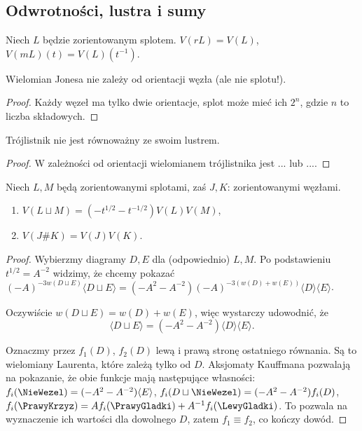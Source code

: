 \subsection{Odwrotności, lustra i sumy}

\begin{twierdzenie}
Niech $L$ będzie zorientowanym splotem.
$V(rL)=V(L)$, $V(mL)(t)=V(L)(t^{-1})$.
\end{twierdzenie}

\begin{wniosek}
Wielomian Jonesa nie zależy od orientacji węzła (ale nie splotu!).
\end{wniosek}

\begin{proof}
Każdy węzeł ma tylko dwie orientacje, splot może mieć ich $2^n$, gdzie $n$ to liczba składowych.
\end{proof}

\begin{wniosek}
Trójlistnik nie jest równoważny ze swoim lustrem.
\end{wniosek}

\begin{proof}
W zależności od orientacji wielomianem trójlistnika jest $...$ lub $...$.
\end{proof}

\begin{twierdzenie}
Niech $L, M$ będą zorientowanymi splotami, zaś $J, K$: zorientowanymi węzłami.
\begin{enumerate}
\item $V(L \sqcup M) = (-t^{1/2} - t^{-1/2}) V(L) V(M)$,
\item $V(J \# K) = V(J) V(K)$.
\end{enumerate}
\end{twierdzenie}

\begin{proof}
Wybierzmy diagramy $D, E$ dla (odpowiednio) $L, M$.
Po podstawieniu $t^{1/2}=A^{-2}$ widzimy, że chcemy pokazać $(-A)^{-3w(D\sqcup E)}\langle D\sqcup E\rangle =(-A^2-A^{-2})(-A)^{-3(w(D)+w(E))}\langle D\rangle  \langle E\rangle$.

Oczywiście $w(D\sqcup E)=w(D)+w(E)$, więc wystarczy udowodnić, że 
\[
	\langle D\sqcup E\rangle = (-A^2-A^{-2})\langle D\rangle\langle E\rangle.
\]

Oznaczmy przez $f_1(D)$, $f_2(D)$ lewą i prawą stronę ostatniego równania.
Są to wielomiany Laurenta, które zależą tylko od $D$.
Aksjomaty Kauffmana pozwalają na pokazanie, że obie funkcje mają następujące własności:
$f_i(\NieWezel)=(-A^2-A^{-2})\langle E\rangle$, $f_i(D\sqcup\NieWezel)=(-A^2-A^{-2})f_i(D)$, $f_i(\PrawyKrzyz)=Af_i(\PrawyGladki) + A^{-1}f_i(\LewyGladki)$.
To pozwala na wyznaczenie ich wartości dla dowolnego $D$, zatem $f_1 \equiv f_2$, co kończy dowód.
\end{proof}

